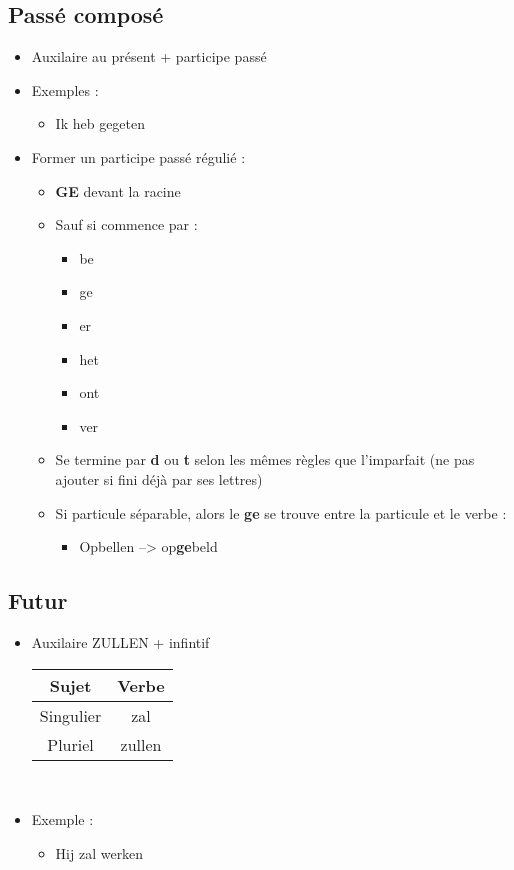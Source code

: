 \documentclass[a4paper]{article}
\begin{document}
\subsection{Passé composé}
\begin{itemize}[label=\textbullet, font=\Large]
  \item Auxilaire au présent + participe passé
  \item Exemples :
  \begin{itemize}[label=, font=\scriptsize]
    \item Ik heb gegeten
  \end{itemize}
  \item Former un participe passé régulié :
  \begin{itemize}[label=, font=\scriptsize]
    \item \textbf{GE} devant la racine
    \item Sauf si commence par :
    \begin{itemize}
      \item be
      \item ge
      \item er 
      \item het 
      \item ont 
      \item ver 
    \end{itemize}
    \item Se termine par \textbf{d} ou \textbf{t} selon les mêmes règles que l'imparfait (ne pas ajouter si fini déjà par ses lettres)
    \item Si particule séparable, alors le \textbf{ge} se trouve entre la particule et le verbe :
    \begin{itemize}
      \item Opbellen --> op\textbf{ge}beld
    \end{itemize}
  \end{itemize}
\end{itemize}
\subsection{Futur}
\begin{itemize}[label=\textbullet, font=\Large]
  \item Auxilaire ZULLEN + infintif\\[0.2cm]
  \begin{tabular}{|c|c|}
      \hline
      \textbf{Sujet} & \textbf{Verbe}\\
      \hline
      Singulier & zal\\
      \hline
      Pluriel & zullen\\
      \hline
    \end{tabular}\\
  \item Exemple :
  \begin{itemize}[label=, font=\scriptsize]
    \item Hij zal werken
  \end{itemize}
\end{itemize}
\end{document}
